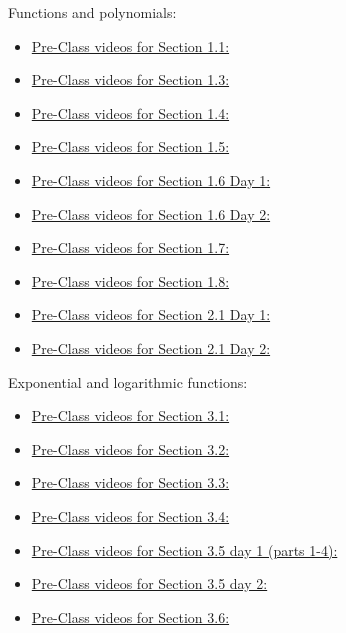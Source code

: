 \documentclass[12pt]{article}
\newcommand{\videoLink}[2]{%
  \href{#2}{Pre-Class videos for #1:}
}
\begin{document}
Functions and polynomials:
\begin{itemize}
\item \videoLink{Section 1.1}{https://www.youtube.com/playlist?list=PLYHZK3b8UFw3ad1wlhTMGcL5kgita6QGS}
\item  \videoLink{Section 1.3}{https://www.youtube.com/playlist?list=PLYHZK3b8UFw1_K7VRAlYGdUZOaqjJTOZ\_}
\item  \videoLink{Section 1.4}{https://www.youtube.com/playlist?list=PLYHZK3b8UFw0jGzT4r6nABTLh3CI6eVst}
\item  \videoLink{Section 1.5}{https://www.youtube.com/playlist?list=PLYHZK3b8UFw0ZgjxBc6v6QlaHhSZheL-B}
\item  \videoLink{Section 1.6 Day 1}{https://www.youtube.com/playlist?list=PLYHZK3b8UFw3srUWdN3pnV1WRNsEcqx-T}
\item  \videoLink{Section 1.6 Day 2}{https://www.youtube.com/playlist?list=PLYHZK3b8UFw3PC3qUoQPSdpFhzCqjRG8m}
\item  \videoLink{Section 1.7}{https://www.youtube.com/playlist?list=PLYHZK3b8UFw0MGYUVN9Z4aYof_QgbFw7f}
\item  \videoLink{Section 1.8}{https://www.youtube.com/playlist?list=PLYHZK3b8UFw2GleEiLibLzFIsnrHdy43\_}
\item  \videoLink{Section 2.1 Day 1}{https://www.youtube.com/playlist?list=PLYHZK3b8UFw1r2QdO6Pgj4jg4-OBM6h1I}
\item  \videoLink{Section 2.1 Day 2}{https://www.youtube.com/playlist?list=PLYHZK3b8UFw3qJR_5u0E1b2wuXCeuCBIX}
\end{itemize}

Exponential and logarithmic functions:
\begin{itemize}
\item \videoLink{Section 3.1}{https://www.youtube.com/playlist?list=PLYHZK3b8UFw2aq4QBoSuTAkPcWN5e-afh}
\item \videoLink{Section 3.2}{https://www.youtube.com/playlist?list=PLYHZK3b8UFw3OE2GrAT4IExxBw5meagdH}
\item \videoLink{Section 3.3}{https://www.youtube.com/playlist?list=PLYHZK3b8UFw0UKAko9PhlIZXI78LYusTN}
\item \videoLink{Section 3.4}{https://www.youtube.com/playlist?list=PLYHZK3b8UFw3229NnJqFoe05V02x1QMb8}
\item \videoLink{Section 3.5 day 1 (parts 1-4)}{https://www.youtube.com/playlist?list=PLYHZK3b8UFw3bN2A-OphS45t9N4M0RDMM}
\item \videoLink{Section 3.5 day 2}{https://www.youtube.com/playlist?list=PLYHZK3b8UFw2U675u2QqFyf9AQlpZ6AZJ}
\item \videoLink{Section 3.6}{https://www.youtube.com/playlist?list=PLYHZK3b8UFw04wc4Aab-D4cpbnFK9E6Va}
\end{itemize}
\end{document}
